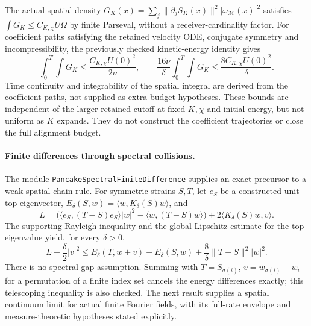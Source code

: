 \documentclass[11pt]{article}
\theoremstyle{definition}
\begin{document}
The actual spatial density
$G_K(x)=\sum_j\|\partial_j S_K(x)\|^2|\omega_{\mathcal M}(x)|^2$
satisfies $\int G_K\le C_{K,\chi}U\Omega$ by finite Parseval, without
a receiver-cardinality factor. For coefficient paths satisfying the
retained velocity ODE, conjugate symmetry and incompressibility, the
previously checked kinetic-energy identity gives
\[
 \int_0^T\!\int G_K\le \frac{C_{K,\chi}U(0)^2}{2\nu},
 \qquad
 \frac{16\nu}{\delta}\int_0^T\!\int G_K
       \le \frac{8C_{K,\chi}U(0)^2}{\delta}.
\]
Time continuity and integrability of the spatial integral are derived
from the coefficient paths, not supplied as extra budget hypotheses.
These bounds are independent of the larger retained cutoff at fixed
$K,\chi$ and initial energy, but not uniform as $K$ expands. They do not
construct the coefficient trajectories or close the full alignment budget.

\paragraph{Finite differences through spectral collisions.}
The module \texttt{PancakeSpectralFiniteDifference} supplies an exact
precursor to a weak spatial chain rule. For symmetric strains $S,T$,
let $e_S$ be a constructed unit top eigenvector,
$E_\delta(S,w)=\langle w,K_\delta(S)w\rangle$, and
\[
 L=\bigl(\langle e_S,(T-S)e_S\rangle|w|^2
                  -\langle w,(T-S)w\rangle\bigr)
             +2\langle K_\delta(S)w,v\rangle.
\]
The supporting Rayleigh inequality and the global Lipschitz estimate
for the top eigenvalue yield, for every $\delta>0$,
\[
 L+\frac\delta2|v|^2
 \le E_\delta(T,w+v)-E_\delta(S,w)
                 +\frac8\delta\|T-S\|^2|w|^2.
\]
There is no spectral-gap assumption. Summing with
$T=S_{\sigma(i)}$, $v=w_{\sigma(i)}-w_i$ for a permutation of a finite
index set cancels the energy differences exactly; this telescoping
inequality is also checked. The next result supplies a spatial continuum
limit for actual finite Fourier fields, with its full-rate envelope
and measure-theoretic hypotheses stated explicitly.
\end{document}
